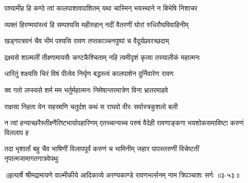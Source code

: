 \twolineshloka
{पश्यामीह हि कण्ठे त्वां कालपाशावपाशितम्}
{यथा चास्मिन् भयस्थाने न बिभेषि निशाचर} %

\twolineshloka
{व्यक्तं हिरण्मयांस्त्वं हि सम्पश्यसि महीरुहान्}
{नदीं वैतरणीं घोरां रुधिरौघविवाहिनीम्} %

\twolineshloka
{खड्गपत्रवनं चैव भीमं पश्यसि रावण}
{तप्तकाञ्चनपुष्पां च वैदूर्यप्रवरच्छदाम्} %

\twolineshloka
{द्रक्ष्यसे शाल्मलीं तीक्ष्णामायसैः कण्टकैश्चिताम्}
{नहि त्वमीदृशं कृत्वा तस्यालीकं महात्मनः} %

\twolineshloka
{धारितुं शक्ष्यसि चिरं विषं पीत्वेव निर्घृण}
{बद्धस्त्वं कालपाशेन दुर्निवारेण रावण} %

\twolineshloka
{क्व गतो लप्स्यसे शर्म मम भर्तुर्महात्मनः}
{निमेषान्तरमात्रेण विना भ्रातरमाहवे} %

\twolineshloka
{राक्षसा निहता येन सहस्राणि चतुर्दश}
{कथं स राघवो वीरः सर्वास्त्रकुशलो बली} %

\threelineshloka
{न त्वां हन्याच्छरैस्तीक्ष्णैरिष्टभार्यापहारिणम्}
{एतच्चान्यच्च परुषं वैदेही रावणाङ्कगा}
{भयशोकसमाविष्टा करुणं विललाप ह} %

\twolineshloka
{तदा भृशार्तां बहु चैव भाषिणीं विलापपूर्वं करुणं च भामिनीम्}
{जहार पापस्तरुणीं विचेष्टतीं नृपात्मजामागतगात्रवेपथुः} %


॥इत्यार्षे श्रीमद्रामायणे वाल्मीकीये आदिकाव्ये अरण्यकाण्डे रावणभर्त्सनम् नाम त्रिपञ्चाशः सर्गः ॥३-५३॥
